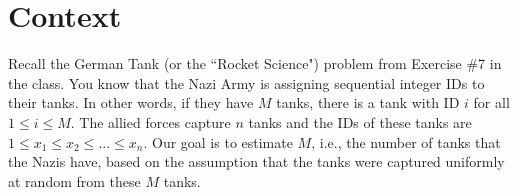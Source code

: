 \section*{Context}
Recall the German Tank (or the ``Rocket Science") problem from Exercise \#7 in the class. You know that the Nazi Army is assigning sequential integer IDs to their tanks. In other words, if they have $M$ tanks, there is a tank with ID $i$ for all $1\leq i \leq M$. The allied forces capture $n$ tanks and the IDs of these tanks are $1 \leq x_1 \leq  x_2 \leq  ... \leq x_n$. Our goal is to estimate $M$, i.e., the number of tanks that the Nazis have, based on the assumption that the tanks were captured uniformly at random from these $M$ tanks.

\newpage
